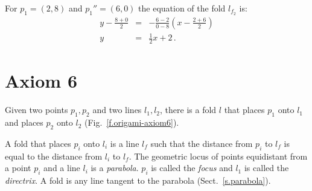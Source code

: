 \begin{example}
For $p_1=(2,8)$ and $p_1''=(6,0)$ the equation of the fold $l_{f_2}$ is:
%
\begin{eqnarray*}
y-\frac{8+0}{2}&=&-\frac{6-2}{0-8}\left(x-\frac{2+6}{2}\right)\\
y&=&\frac{1}{2}x+2\,.
\end{eqnarray*}
\end{example}




\section{Axiom 6}\label{s.ax6}
\begin{axiom}
Given two points $p_1,p_2$ and two lines $l_1,l_2$, there is a fold $l$ that places $p_1$ onto $l_1$ and places $p_2$ onto $l_2$ (Fig.~\ref{f.origami-axiom6}).
\end{axiom}

A fold that places $p_i$ onto $l_i$ is a line $l_f$ such that the distance from $p_i$ to $l_f$ is equal to the distance from $l_i$ to $l_f$. The geometric locus of points equidistant from a point $p_i$ and a line $l_i$ is a \emph{parabola}. $p_i$ is called the \emph{focus} and $l_1$ is called the \emph{directrix}. A fold is any line tangent to the parabola (Sect.~\ref{s.parabola}).

